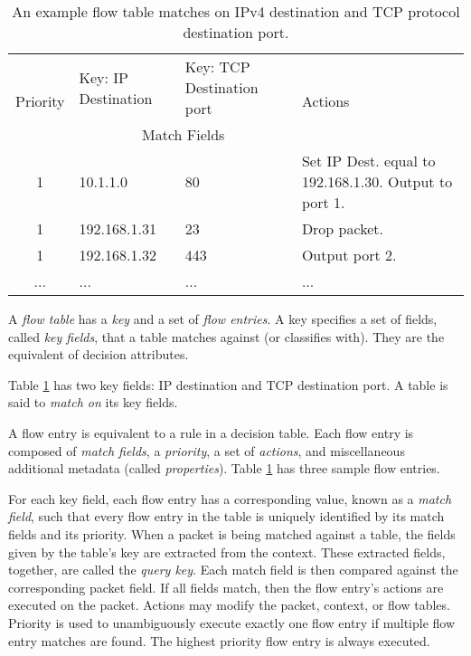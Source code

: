 \begin{table}[ht]
\caption{An example flow table matches on IPv4 destination and TCP protocol destination port.}
\label{tbl:flow_table}
\centering
\begin{tabularx}{\linewidth}{| c | X | X | X |}
\hline
\multirow{2}{*}{Priority} & Key: IP Destination & Key: TCP Destination port  & \multirow{2}{*}{Actions} \\
\cline{2-3}
  & \multicolumn{2}{|c|}{Match Fields} & \\
\hline
\hline
1 & 10.1.1.0 & 80 & Set IP Dest. equal to 192.168.1.30. Output to port 1. \\
\hline
1 & 192.168.1.31 & 23 & Drop packet. \\
\hline
1 & 192.168.1.32 & 443 & Output port 2. \\
\hline
... & ... & ... & ... \\
\hline
\end{tabularx}
\end{table}


A \textit{flow table} has a \textit{key} and a set of \textit{flow entries}. A
key specifies a set of fields, called \textit{key fields}, that a table matches
against (or classifies with). They are the equivalent of decision attributes.

Table \ref{tbl:flow_table} has two key fields: IP destination and TCP destination port. A table is said to \textit{match on} its key fields.

A flow entry is equivalent to a rule in a decision table. Each flow entry is
composed of \textit{match fields}, a \textit{priority}, a set of
\textit{actions}, and miscellaneous additional metadata (called
\textit{properties}). Table \ref{tbl:flow_table} has three sample flow entries. 

For each key field, each flow entry has a corresponding value, known as a
\textit{match field}, such that every flow entry in the table is uniquely
identified by its match fields and its priority. When a packet is being matched
against a table, the fields given by the table's key are extracted from the
context. These extracted fields, together, are called the \textit{query key}.
Each match field is then compared against the corresponding packet field. If all
fields match, then the flow entry's actions are executed on the packet. Actions
may modify the packet, context, or flow tables. Priority is used to
unambiguously execute exactly one flow entry if multiple flow entry matches are
found. The highest priority flow entry is always executed.

